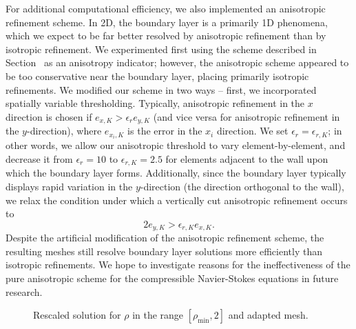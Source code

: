 For additional computational efficiency, we also implemented an anisotropic refinement scheme.  In 2D, the boundary layer is a primarily 1D phenomena, which we expect to be far better resolved by anisotropic refinement than by isotropic refinement.  We experimented first using the scheme described in Section~ as an anisotropy indicator; however, the anisotropic scheme appeared to be too conservative near the boundary layer, placing primarily isotropic refinements.  We modified our scheme in two ways -- first, we incorporated spatially variable thresholding.  Typically, anisotropic refinement in the $x$ direction is chosen if $e_{x,K} > \epsilon_r e_{y,K}$ (and vice versa for anisotropic refinement in the $y$-direction), where $e_{x_i,K}$ is the error in the $x_i$ direction.  We set $\epsilon_r = \epsilon_{r,K}$; in other words, we allow our anisotropic threshold to vary element-by-element, and decrease it from $\epsilon_r= 10$ to $\epsilon_{r,K} = 2.5$ for elements adjacent to the wall upon which the boundary layer forms.  Additionally, since the boundary layer typically displays rapid variation in the $y$-direction (the direction orthogonal to the wall), we relax the condition under which a vertically cut anisotropic refinement occurs to
\[
2 e_{y,K} > \epsilon_{r,K} e_{x,K}.
\]
Despite the artificial modification of the anisotropic refinement scheme, the resulting meshes still resolve boundary layer solutions more efficiently than isotropic refinements.  We hope to investigate reasons for the ineffectiveness of the pure anisotropic scheme for the compressible Navier-Stokes equations in future research.  

\begin{figure}
\centering
{}
\caption{Rescaled solution for $\rho$ in the range $[\rho_{\min},2]$ and adapted mesh.}
\label{fig:rhoScaled}
\end{figure}

